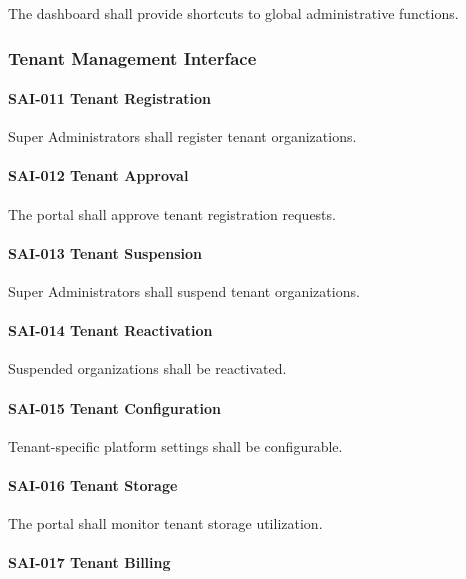 The dashboard shall provide shortcuts to global administrative
functions.


\subsubsection*{Tenant Management Interface}

\paragraph{SAI-011 Tenant Registration}

Super Administrators shall register tenant organizations.

\paragraph{SAI-012 Tenant Approval}

The portal shall approve tenant registration requests.

\paragraph{SAI-013 Tenant Suspension}

Super Administrators shall suspend tenant organizations.

\paragraph{SAI-014 Tenant Reactivation}

Suspended organizations shall be reactivated.

\paragraph{SAI-015 Tenant Configuration}

Tenant-specific platform settings shall be configurable.

\paragraph{SAI-016 Tenant Storage}

The portal shall monitor tenant storage utilization.

\paragraph{SAI-017 Tenant Billing}

